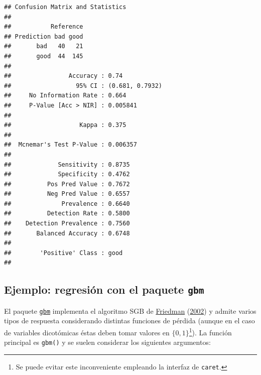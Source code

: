 \documentclass[
  spanish,
]{book}
\newenvironment{Shaded}{\begin{snugshade}}{\end{snugshade}}
\newcommand{\AttributeTok}[1]{\textcolor[rgb]{0.77,0.63,0.00}{#1}}
\newcommand{\FunctionTok}[1]{\textcolor[rgb]{0.00,0.00,0.00}{#1}}
\newcommand{\NormalTok}[1]{#1}
\newcommand{\SpecialCharTok}[1]{\textcolor[rgb]{0.00,0.00,0.00}{#1}}
\newcommand{\StringTok}[1]{\textcolor[rgb]{0.31,0.60,0.02}{#1}}
\theoremstyle{break}
\theoremstyle{definition}
\theoremstyle{definition}
\theoremstyle{definition}
\theoremstyle{definition}
\theoremstyle{remark}
\begin{document}
\begin{Shaded}
\end{Shaded}

\begin{verbatim}
## Confusion Matrix and Statistics
## 
##           Reference
## Prediction bad good
##       bad   40   21
##       good  44  145
##                                          
##                Accuracy : 0.74           
##                  95% CI : (0.681, 0.7932)
##     No Information Rate : 0.664          
##     P-Value [Acc > NIR] : 0.005841       
##                                          
##                   Kappa : 0.375          
##                                          
##  Mcnemar's Test P-Value : 0.006357       
##                                          
##             Sensitivity : 0.8735         
##             Specificity : 0.4762         
##          Pos Pred Value : 0.7672         
##          Neg Pred Value : 0.6557         
##              Prevalence : 0.6640         
##          Detection Rate : 0.5800         
##    Detection Prevalence : 0.7560         
##       Balanced Accuracy : 0.6748         
##                                          
##        'Positive' Class : good           
## 
\end{verbatim}

\hypertarget{ejemplo-regresiuxf3n-con-el-paquete-gbm}{%
\subsection{\texorpdfstring{Ejemplo: regresión con el paquete \texttt{gbm}}{Ejemplo: regresión con el paquete gbm}}\label{ejemplo-regresiuxf3n-con-el-paquete-gbm}}

El paquete \href{https://CRAN.R-project.org/package=gbm}{\texttt{gbm}} implementa el algoritmo SGB de \protect\hyperlink{ref-friedman2002stochastic}{Friedman} (\protect\hyperlink{ref-friedman2002stochastic}{2002}) y admite varios tipos de respuesta considerando distintas funciones de pérdida (aunque en el caso de variables dicotómicas éstas deben tomar valores en \(\{0, 1\}\)\footnote{Se puede evitar este inconveniente empleando la interfaz de \texttt{caret}.}).
La función principal es \texttt{gbm()} y se suelen considerar los siguientes argumentos:
\end{document}
